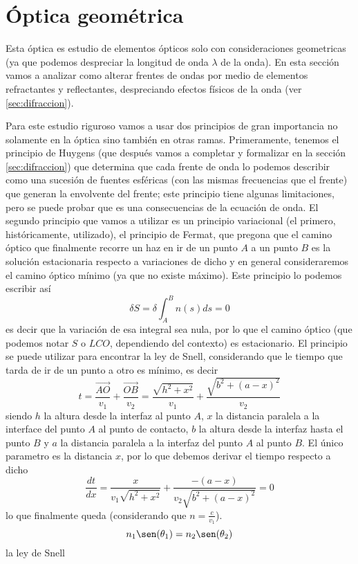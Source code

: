 \documentclass[a4paper,spanish]{article}
\numberwithin{equation}{section}
\begin{document}
\part{\'Optica geom\'etrica}
		Esta \'optica es estudio de elementos \'opticos solo con consideraciones geometricas (ya que podemos despreciar la longitud de onda $\lambda$ de la onda). En esta secci\'on vamos a analizar como alterar frentes de ondas por medio de elementos refractantes y reflectantes, despreciando efectos f\'isicos de la onda (ver \ref{sec:difraccion}).
		
		Para este estudio riguroso vamos a usar dos principios de gran importancia no solamente en la \'optica sino tambi\'en en otras ramas. Primeramente, tenemos el principio de Huygens (que despu\'es vamos a completar y formalizar en la secci\'on \ref{sec:difraccion}) que determina que cada frente de onda lo podemos describir como una sucesi\'on de fuentes esf\'ericas (con las mismas frecuencias que el frente) que generan la envolvente del frente; este principio tiene algunas limitaciones, pero se puede probar que es una consecuencias de la ecuaci\'on de onda. El segundo principio que vamos a utilizar es un principio variacional (el primero, hist\'oricamente, utilizado), el principio de Fermat, que pregona que el camino \'optico que finalmente recorre un haz en ir de un punto $A$ a un punto $B$ es la soluci\'on estacionaria respecto a variaciones de dicho y en general consideraremos el camino \'optico m\'inimo (ya que no existe m\'aximo). Este principio lo podemos escribir as\'i
		\begin{equation}
			\delta S = \delta \int_{A}^{B} n(s) ds = 0
			\label{eq:optica_fermat}
		\end{equation}
		es decir que la variaci\'on de esa integral sea nula, por lo que el camino \'optico (que podemos notar $S$ o $LCO$, dependiendo del contexto) es estacionario. El principio se puede utilizar para encontrar la ley de Snell, considerando que le tiempo que tarda de ir de un punto a otro es m\'inimo, es decir \[ t = \frac{\vec{AO}}{v_1} + \frac{\vec{OB}}{v_2} = \frac{\sqrt{h^2+x^2}}{v_1} + \frac{\sqrt{b^2+(a - x)^2}}{v_2}\] siendo $h$ la altura desde la interfaz al punto $A$, $x$ la distancia paralela a la interface del punto $A$ al punto de contacto, $b$ la altura desde la interfaz hasta el punto $B$ y $a$ la distancia paralela a la interfaz del punto $A$ al punto $B$. El \'unico parametro es la distancia $x$, por lo que debemos derivar el tiempo respecto a dicho \[\frac{d t}{d x} = \frac{x}{v_1 \sqrt{h^2 + x^2}} + \frac{ -(a - x)}{v_2 \sqrt{b^2 + (a - x)^2}} = 0\] lo que finalmente queda (considerando que $n = \frac{c}{v_1}$).
		\begin{equation}
			n_1 \sen(\theta_1) = n_2 \sen(\theta_2)
			\label{eq:snell}
		\end{equation}
		la ley de Snell
	
\end{document}
